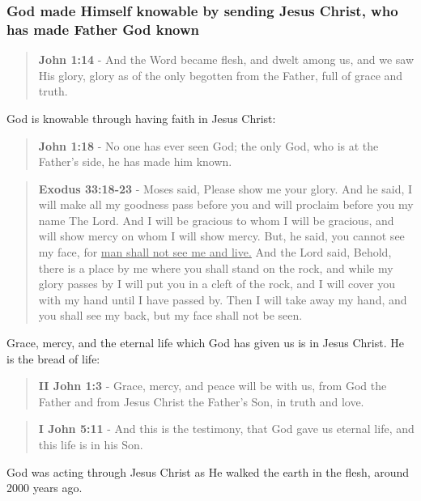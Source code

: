 \documentclass[11pt]{article}
\begin{document}
\subsubsection{God made Himself knowable by sending Jesus Christ, who has made Father God known}
\label{sec:orgc002d79}

\begin{quote}
\textbf{John 1:14} - And the Word became flesh, and dwelt among us, and we saw His glory, glory as of the only begotten from the Father, full of grace and truth.
\end{quote}

God is knowable through having faith in Jesus Christ:

\begin{quote}
\textbf{John 1:18} - No one has ever seen God; the only God, who is at the Father's side, he has made him known.
\end{quote}

\begin{quote}
\textbf{Exodus 33:18-23} - Moses said, Please show me your glory. And he said, I will make all my goodness pass before you and will proclaim before you my name The Lord. And I will be gracious to whom I will be gracious, and will show mercy on whom I will show mercy. But, he said, you cannot see my face, for \uline{man shall not see me and live.} And the Lord said, Behold, there is a place by me where you shall stand on the rock, and while my glory passes by I will put you in a cleft of the rock, and I will cover you with my hand until I have passed by. Then I will take away my hand, and you shall see my back, but my face shall not be seen.
\end{quote}

Grace, mercy, and the eternal life which God has given us is in Jesus Christ. He is the bread of life:

\begin{quote}
\textbf{II John 1:3} - Grace, mercy, and peace will be with us, from God the Father and from Jesus Christ the Father's Son, in truth and love.
\end{quote}

\begin{quote}
\textbf{I John 5:11} - And this is the testimony, that God gave us eternal life, and this life is in his Son.
\end{quote}

God was acting through Jesus Christ as He walked the earth in the flesh, around 2000 years ago.
\end{document}
